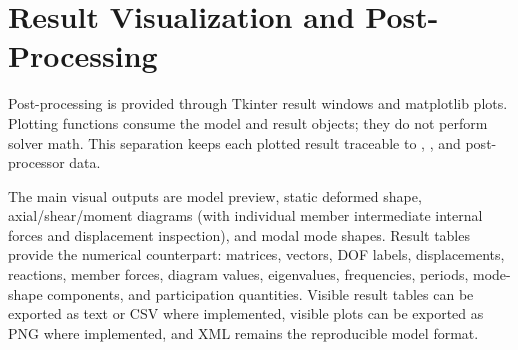 \section{Result Visualization and Post-Processing}

Post-processing is provided through Tkinter result windows and matplotlib plots. Plotting functions consume the model and result objects; they do not perform solver math. This separation keeps each plotted result traceable to , , and post-processor data.


The main visual outputs are model preview, static deformed shape, axial/shear/moment diagrams (with individual member intermediate internal forces and displacement inspection), and modal mode shapes. Result tables provide the numerical counterpart: matrices, vectors, DOF labels, displacements, reactions, member forces, diagram values, eigenvalues, frequencies, periods, mode-shape components, and participation quantities. Visible result tables can be exported as text or CSV where implemented, visible plots can be exported as PNG where implemented, and XML remains the reproducible model format.
